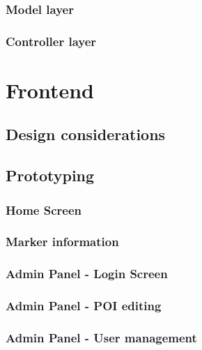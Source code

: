 \subsubsection{Model layer}

\subsubsection{Controller layer}

\section{Frontend}
\label{sec:frontend}

\subsection{Design considerations}

\subsection{Prototyping}

\subsubsection{Home Screen}


\subsubsection{Marker information}

\subsubsection{Admin Panel - Login Screen}
\subsubsection{Admin Panel - POI editing}

\subsubsection{Admin Panel - User management}

